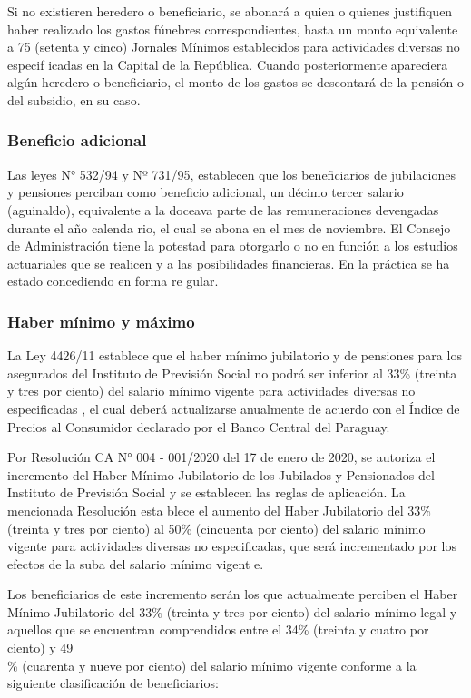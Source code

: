 Si no existieren heredero o beneficiario, se abonará a quien o quienes
justifiquen haber realizado los gastos fúnebres correspondientes, hasta
un monto equivalente a 75 (setenta y cinco) Jornales Mínimos
establecidos para actividades diversas no especif icadas en la Capital
de la República. Cuando posteriormente apareciera algún heredero o
beneficiario, el monto de los gastos se descontará de la pensión o del
subsidio, en su caso.

\subsubsection{Beneficio adicional}

Las leyes N° 532/94 y Nº 731/95, establecen que los beneficiarios de
jubilaciones y pensiones perciban como beneficio adicional, un décimo
tercer salario (aguinaldo), equivalente a la doceava parte de las
remuneraciones devengadas durante el año calenda rio, el cual se abona
en el mes de noviembre. El Consejo de Administración tiene la potestad
para otorgarlo o no en función a los estudios actuariales que se
realicen y a las posibilidades financieras. En la práctica se ha estado
concediendo en forma re gular.

\subsubsection{Haber mínimo y máximo}

La Ley 4426/11 establece que el haber mínimo jubilatorio y de pensiones
para los asegurados del Instituto de Previsión Social no podrá ser
inferior al 33\% (treinta y tres por ciento) del salario mínimo vigente
para actividades diversas no especificadas , el cual deberá actualizarse
anualmente de acuerdo con el Índice de Precios al Consumidor declarado
por el Banco Central del Paraguay.

Por Resolución CA N° 004 - 001/2020 del 17 de enero de 2020, se autoriza
el incremento del Haber Mínimo Jubilatorio de los Jubilados y
Pensionados del Instituto de Previsión Social y se establecen las reglas
de aplicación. La mencionada Resolución esta blece el aumento del Haber
Jubilatorio del 33\% (treinta y tres por ciento) al 50\% (cincuenta por
ciento) del salario mínimo vigente para actividades diversas no
especificadas, que será incrementado por los efectos de la suba del
salario mínimo vigent e\cite{IPS. (2020)}.

Los beneficiarios de este incremento serán los que actualmente perciben
el Haber Mínimo Jubilatorio del 33\% (treinta y tres por ciento) del
salario mínimo legal y aquellos que se encuentran comprendidos entre el
34\% (treinta y cuatro por ciento) y 49\\
\% (cuarenta y nueve por ciento) del salario mínimo vigente conforme a
la siguiente clasificación de beneficiarios:

